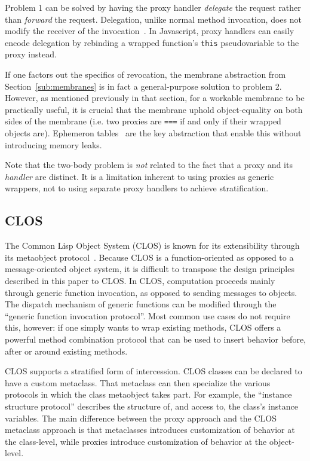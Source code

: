 \documentclass{acm_proc_article-sp}
\begin{document}
Problem 1 can be solved by having the proxy handler \emph{delegate} the request rather than \emph{forward} the request. Delegation, unlike normal method invocation, does not modify the receiver of the invocation~\cite{lieberman86prototypical}. In Javascript, proxy handlers can easily encode delegation by rebinding a wrapped function's \texttt{this} pseudovariable to the proxy instead.

If one factors out the specifics of revocation, the membrane abstraction from Section~\ref{sub:membranes} is in fact a general-purpose solution to problem 2. However, as mentioned previously in that section, for a workable membrane to be practically useful, it is crucial that the membrane uphold object-equality on both sides of the membrane (i.e. two proxies are \texttt{===} if and only if their wrapped objects are). Ephemeron tables~\cite{miller10et} are the key abstraction that enable this without introducing memory leaks.

Note that the two-body problem is \emph{not} related to the fact that a proxy and its \emph{handler} are distinct. It is a limitation inherent to using proxies as generic wrappers, not to using separate proxy handlers to achieve stratification.

\subsection{CLOS}

The Common Lisp Object System (CLOS) is known for its extensibility through its metaobject protocol~\cite{kiczales91art}. Because CLOS is a function-oriented as opposed to a message-oriented object system, it is difficult to transpose the design principles described in this paper to CLOS. In CLOS, computation proceeds mainly through generic function invocation, as opposed to sending messages to objects. The dispatch mechanism of generic functions can be modified through the ``generic function invocation protocol''. Most common use cases do not require this, however: if one simply wants to wrap existing methods, CLOS offers a powerful method combination protocol that can be used to insert behavior before, after or around existing methods.

CLOS supports a stratified form of intercession. CLOS classes can be declared to have a custom metaclass. That metaclass can then specialize the various protocols in which the class metaobject takes part. For example, the ``instance structure protocol'' describes the structure of, and access to, the class's instance variables. The main difference between the proxy approach and the CLOS metaclass approach is that metaclasses introduces customization of behavior at the class-level, while proxies introduce customization of behavior at the object-level.
\end{document}
